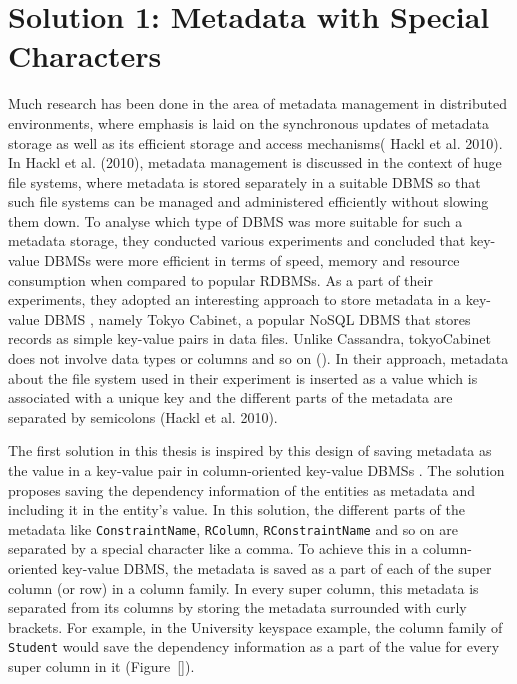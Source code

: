 \section{Solution 1:  Metadata with Special Characters}\label{s:sol1}
	Much research has been done in the area of  metadata management in distributed
	environments,  where emphasis is laid on the synchronous updates of metadata
	storage as well as its efficient storage and access mechanisms(
	Hackl et al.  2010). 
	In Hackl et al.  (2010),  metadata management is discussed in the context of
	huge file systems, where metadata is stored separately in a suitable \ac{DBMS}
	so that such file systems can be managed and administered efficiently without
	slowing them down.  To analyse which type of \ac{DBMS} was more suitable for such a
	metadata storage,  they conducted various experiments and concluded that
	key-value \acp{DBMS} were more efficient in terms of speed,  memory and resource
	consumption when compared to popular \acp{RDBMS}.  As a part of their
	experiments, they adopted an interesting approach to store metadata in a
	key-value \ac{DBMS} ,  namely Tokyo Cabinet,  a popular \ac{NoSQL} \ac{DBMS}
	that stores records as simple key-value pairs in data files. Unlike Cassandra,
	tokyoCabinet does not involve data types or columns
	and so on ().  In their approach,  metadata about the file system
	used in their experiment is inserted as a value which is associated with a unique key and the
	different parts of the metadata are separated by semicolons (Hackl et al.  2010). 
	
	The first solution   in this thesis is inspired by this design of saving
	metadata as the value in a key-value pair  in
	column-oriented key-value \acp{DBMS} . 
	The solution proposes saving the dependency information of the entities as
	metadata and including it in the entity's value.  In this solution, the 
	different parts of the metadata like \texttt{ConstraintName},  \texttt{RColumn},  \texttt{RConstraintName} and so on
	are separated by a special character like a comma. 
	To achieve this in a column-oriented key-value \ac{DBMS}, the metadata is saved
	as a part of each of the super column (or row) in a column family. 
	In every super column,  this metadata is separated from its columns
	 by storing the metadata surrounded with curly brackets. For example,  in the
	 University keyspace example,  the column family of \texttt{Student} would save
	 the dependency information as a part of the value  for every  super
	 column in it (Figure~\ref{}). 
	
